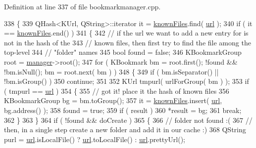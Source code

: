 Definition at line 337 of file bookmarkmanager.\+cpp.


\begin{DoxyCode}
338 \{
339     QHash<KUrl, QString>::iterator it = \hyperlink{classBookmarkManager_1_1Private_ad4ef503c3bf977fc59f04ea5c89b2968}{knownFiles}.find( \hyperlink{classBookmarkManager_1_1Private_a76891cf0a4b6713612876ee2eceee94d}{url} );
340     \textcolor{keywordflow}{if} ( it == \hyperlink{classBookmarkManager_1_1Private_ad4ef503c3bf977fc59f04ea5c89b2968}{knownFiles}.end() )
341     \{
342         \textcolor{comment}{// if the url we want to add a new entry for is not in the hash of the}
343         \textcolor{comment}{// known files, then first try to find the file among the top-level}
344         \textcolor{comment}{// "folder" names}
345         \textcolor{keywordtype}{bool} found = \textcolor{keyword}{false};
346         KBookmarkGroup root = \hyperlink{classBookmarkManager_1_1Private_a18a0825534de4ad364d428c740e3692f}{manager}->root();
347         \textcolor{keywordflow}{for} ( KBookmark bm = root.first(); !found && !bm.isNull(); bm = root.next( bm ) )
348         \{
349             \textcolor{keywordflow}{if} ( bm.isSeparator() || !bm.isGroup() )
350                 \textcolor{keywordflow}{continue};
351 
352             KUrl tmpurl( urlForGroup( bm ) );
353             \textcolor{keywordflow}{if} ( tmpurl == \hyperlink{classBookmarkManager_1_1Private_a76891cf0a4b6713612876ee2eceee94d}{url} )
354             \{
355                 \textcolor{comment}{// got it! place it the hash of known files}
356                 KBookmarkGroup bg = bm.toGroup();
357                 it = \hyperlink{classBookmarkManager_1_1Private_ad4ef503c3bf977fc59f04ea5c89b2968}{knownFiles}.insert( \hyperlink{classBookmarkManager_1_1Private_a76891cf0a4b6713612876ee2eceee94d}{url}, bg.address() );
358                 found = \textcolor{keyword}{true};
359                 \textcolor{keywordflow}{if} ( result )
360                     *result = bg;
361                 \textcolor{keywordflow}{break};
362             \}
363         \}
364         \textcolor{keywordflow}{if} ( !found && doCreate )
365         \{
366             \textcolor{comment}{// folder not found :(}
367             \textcolor{comment}{// then, in a single step create a new folder and add it in our cache :)}
368             QString purl = \hyperlink{classBookmarkManager_1_1Private_a76891cf0a4b6713612876ee2eceee94d}{url}.isLocalFile() ? \hyperlink{classBookmarkManager_1_1Private_a76891cf0a4b6713612876ee2eceee94d}{url}.toLocalFile() : \hyperlink{classBookmarkManager_1_1Private_a76891cf0a4b6713612876ee2eceee94d}{url}.prettyUrl();

\end{DoxyCode}
